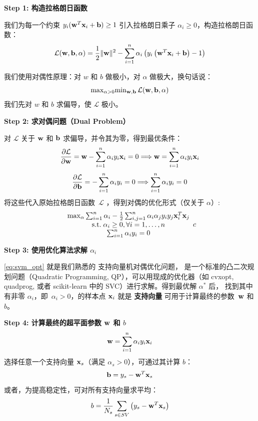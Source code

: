 \textbf{Step 1: 构造拉格朗日函数}

我们为每一个约束 $y_i({\bf w}^T  {\bf x}_i + {\bf b} ) \geq 1$ 引入拉格朗日乘子 $\alpha_i \geq 0$，构造拉格朗日函数：
$$
\mathcal{L}({\bf w}, {\bf b},\alpha) =  \frac{1}{2} \|{\bf w}\|^2 -\sum_{i=1}^n \alpha_i \left(  y_i \left( {\bf w}^T {\bf x}_i +{\bf b}\right)-1\right)
$$


我们使用对偶性原理：对 $w$ 和 $b$ 做极小，对 $\alpha$ 做极大，换句话说：
$$
{\rm max}_{\alpha >0} {\rm min}_{{\bf w}, {\bf b}}\, \mathcal{L}({\bf w}, {\bf b}, \alpha)
$$
我们先对 $w$ 和 $b$ 求偏导，使 $\mathcal{L}$ 极小。

\textbf{Step 2: 求对偶问题（Dual Problem）}

对 $\mathcal{L}$ 关于 ${\bf w}$ 和 ${\bf b}$ 求偏导，并令其为零，得到最优条件：
$$
\frac{\partial\mathcal{L}}{\partial {\bf w}}= {\bf w}- \sum_{i=1}^n \alpha_i y_i {\bf x}_i
= 0 \Longrightarrow {\bf w}= \sum_{i=1}^n \alpha_i y_i {\bf x}_i
$$
$$
\frac{\partial\mathcal{L}}{\partial {\bf b}}=- \sum_{i=1}^n \alpha_i y_i  = 0 \Longrightarrow  \sum_{i=1}^n \alpha_i y_i =0
$$
将这些代入原始拉格朗日函数~$\mathcal{L}$ ，得到对偶的优化形式（仅关于 $\alpha$）:
\begin{equation}\label{eq:svm_opt}
\begin{array}{c}
{\rm max}_{\alpha} \sum_{i=1}^n \alpha_i -\frac{1}{2} \sum_{i,j=1}^n \alpha_i \alpha_j y_i y_j {\bf x}_i^T {\bf x}_j \\
{\rm s.t.} \; \alpha_i \ge 0, \forall i=1, \dots, n \\
  \sum_{i=1}^n \alpha_i y_i =0
  \end{array}{c}
\end{equation}

\textbf{Step 3: 使用优化算法求解 $\alpha_i$}

\eqref{eq:svm_opt} 就是我们熟悉的 支持向量机对偶优化问题， 是一个标准的凸二次规划问题（Quadratic Programming, QP），可以用现成的优化器（如 cvxopt, quadprog, 或者 scikit-learn 中的 SVC）进行求解。得到最优解 $\alpha^*$ 后， 找到其中有非零 $\alpha_i$，即~$\alpha_i>0$，的样本点 ${\bf x}_i$ 就是 \textbf{支持向量}
可用于计算最终的参数~${\bf w}$ 和 $b$。 

\textbf{Step 4: 计算最终的超平面参数 ${\bf w}$ 和 $b$}
$$
{\bf w}= \sum_{i=1}^n \alpha_i y_i {\bf x}_i
$$
选择任意一个支持向量 ${\bf x}_s$（满足 $\alpha_s > 0$），可通过其计算 $b$：
$$
{\bf b}= y_s -{\bf w}^T {\bf x}_s
$$
或者，为提高稳定性，可对所有支持向量求平均：
$$
b= \frac{1}{N_s} \sum_{s\in SV} \left( y_s - {\bf w}^T {\bf x}_s\right)
$$

